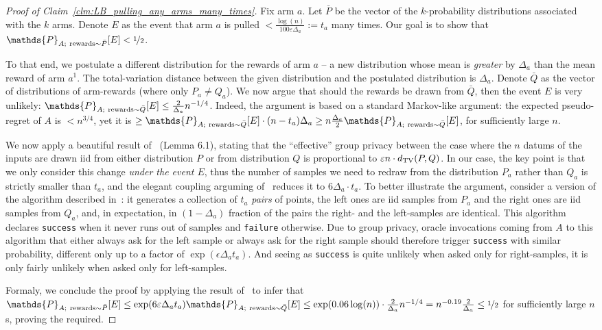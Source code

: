 \documentclass{article}
\renewcommand{\Pr}{\mathds{P}}
\begin{document}
\begin{proof}[Proof of Claim~\ref{clm:LB_pulling_any_arms_many_times}]
Fix arm $a$. Let $\bar P$ be the vector of the $k$-probability distributions associated with the $k$ arms. Denote $E$ as the event that arm $a$ is pulled $<\tfrac{\log(n)}{100\varepsilon\Delta_a} := t_a$ many times. Our goal is to show that $\Pr_{A;~{\rm rewards}\sim \bar P}[E]<\nicefrac 1 2$.

To that end, we postulate a different distribution for the rewards of arm $a$ -- a new distribution whose mean is \emph{greater} by $\Delta_a$ than the mean reward of arm $a^1$. The total-variation distance between the given distribution and the postulated distribution is $\Delta_a$. Denote $\bar Q$ as the vector of distributions of arm-rewards (where only $P_a \neq Q_a$). We now argue that should the rewards be drawn from $\bar Q$, then the event $E$ is  very unlikely: $\Pr_{A;~{\rm rewards}\sim \bar Q}[E] \leq \tfrac 2{\Delta_a}n^{-1/4}$. Indeed, the argument is based on a standard Markov-like argument: the expected pseudo-regret of $A$ is $<n^{3/4}$, yet it is $\geq \Pr_{A;~{\rm rewards}\sim \bar Q}[E]\cdot (n-t_a) \Delta_a \geq n\tfrac{\Delta_a}2\Pr_{A;~{\rm rewards}\sim \bar Q}[E]$, for sufficiently large $n$.


We now apply a beautiful result of~\cite{KarwaVadhanFiniteSampleDP2017} (Lemma 6.1), stating that the ``effective'' group privacy between the case where the $n$ datums of the inputs are drawn iid from either distribution $P$ or from distribution $Q$ is proportional to $\varepsilon n\cdot d_{\rm TV}(P,Q)$. In our case, the key point is that we only consider this change \emph{under the event $E$}, thus the number of samples we need to redraw from the distribution $P_a$ rather than $Q_a$ is strictly smaller than $t_a$, and the elegant coupling arguming of~\cite{KarwaVadhanFiniteSampleDP2017} reduces it to $6\Delta_a \cdot t_a$. To better illustrate the argument, consider a version of the algorithm described in~\cite{KarwaVadhanFiniteSampleDP2017}: it generates a collection of $t_a$ \emph{pairs} of points, the left ones are iid samples from $P_a$ and the right ones are iid samples from $Q_a$, and, in expectation, in $(1-\Delta_a)$ fraction of the pairs the right- and the left-samples are identical. This algorithm declares {\tt success} when it never runs out of samples and {\tt failure} otherwise. Due to group privacy, oracle invocations coming from $A$ to this algorithm that either always ask for the left sample or always ask for the right sample should therefore trigger {\tt success} with similar probability, different only up to a factor of $\exp(\epsilon \Delta_a t_a)$. And seeing as {\tt success} is quite unlikely when asked only for right-samples, it is only fairly unlikely when asked only for left-samples.

Formaly, we conclude the proof by applying the result of~\cite{KarwaVadhanFiniteSampleDP2017} to infer that $\Pr_{A;~{\rm rewards}\sim \bar P}[E] \leq \exp(6\varepsilon\Delta_a t_a)\Pr_{A;~{\rm rewards}\sim \bar Q}[E] \leq \exp(0.06 \log(n)) \cdot \tfrac 2{\Delta_a}n^{-1/4} = n^{-0.19}\tfrac 2{\Delta_a} \leq \nicefrac 1 2$ for sufficiently large $n$s, proving the required.
\end{proof}
\end{document}
